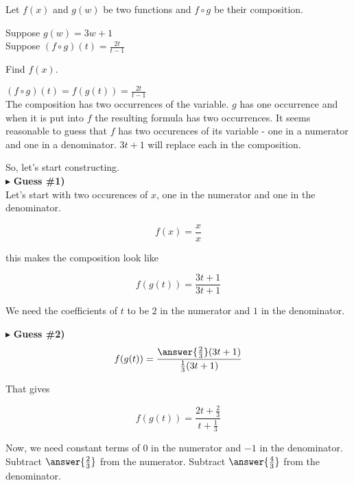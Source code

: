 \documentclass{ximera}
\begin{document}
\begin{example}


Let $f(x)$ and $g(w)$ be two functions and $f \circ g$ be their composition.


Suppose $g(w) = 3w + 1$ \\

Suppose $(f \circ g)(t) = \frac{2t}{t-1}$


Find $f(x)$.



\begin{explanation}




$(f \circ g)(t) =  f(g(t)) =  \frac{2t}{t-1}$ \\



The composition has two occurrences of the variable.  $g$ has one occurrence and when it is put into $f$ the resulting formula has two occurrences.  It seems reasonable to guess that $f$ has two occurences of its variable - one in a numerator and one in a denominator.  $3t + 1$ will replace each in the composition.

So, let's start constructing. \\


$\blacktriangleright$  \textbf{\textcolor{blue!55!black}{Guess \#1)}}   \\

Let's start with two occurences of $x$, one in the numerator and one in the denominator.

\[      f(x) = \frac{x}{x}       \]


this makes the composition look like

\[   f(g(t)) =      \frac{3t + 1}{3t + 1}       \]



We need the coefficients of $t$ to be $2$ in the numerator and $1$ in the denominator.

$\blacktriangleright$  \textbf{\textcolor{blue!55!black}{Guess \#2)}}   \\

\[   f(g(t)) =      \frac{\answer{\frac{2}{3}}(3t + 1)}{\frac{1}{3}(3t + 1)}       \]

That gives


\[   f(g(t)) =      \frac{2t + \frac{2}{3}}{t + \frac{1}{3}}       \]



Now, we need constant terms of $0$ in the numerator and $-1$ in the denominator.  Subtract $\answer{\frac{2}{3}}$ from the numerator. Subtract $\answer{\frac{4}{3}}$ from the denominator. \\


\end{explanation}
\end{example}
\end{document}
